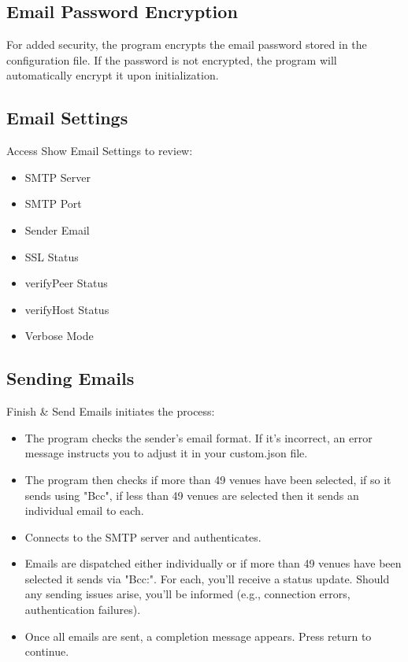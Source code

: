 \documentclass{article}
\begin{document}
	\subsection*{Email Password Encryption}
	For added security, the program encrypts the email password stored in the configuration file. If the password is not encrypted, the program will automatically encrypt it upon initialization. 
	
	\subsection*{Email Settings}
	Access Show Email Settings to review:
	\begin{itemize}
		\item SMTP Server
		\item SMTP Port
		\item Sender Email
		\item SSL Status
		\item verifyPeer Status
		\item verifyHost Status
		\item Verbose Mode
	\end{itemize}

	\subsection*{Sending Emails}
	Finish \& Send Emails initiates the process:
	\begin{itemize}
		\item The program checks the sender's email format. If it's incorrect, an error message instructs you to adjust it in your custom.json file.
		\item The program then checks if more than 49 venues have been selected, if so it sends using "Bcc", if less than 49 venues are selected then it sends an individual email to each.
		\item Connects to the SMTP server and authenticates.
		\item Emails are dispatched either individually or if more than 49 venues have been selected it sends via "Bcc:". For each, you'll receive a status update. Should any sending issues arise, you'll be informed (e.g., connection errors, authentication failures).
		\item Once all emails are sent, a completion message appears. Press return to continue.
	\end{itemize}
	
\end{document}

